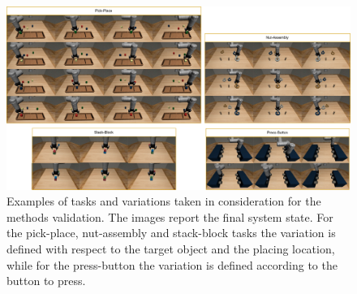 \begin{figure}[t]
    \centering
    \includegraphics[width=1.0\textwidth]{figures/images/ch2/dataset.jpg}
    \caption{Examples of tasks and variations taken in consideration for the methods validation. The images report the final system state. For the pick-place, nut-assembly and stack-block tasks the variation is defined with respect to the target object and the placing location, while for the press-button the variation is defined according to the button to press.}
    \label{fig:dataset_cod}
\end{figure}

